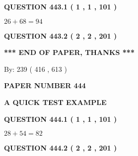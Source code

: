 \documentclass[12pt]{article}
\begin{document}
\vspace{0.2in}
  
{\textbf{\Large{QUESTION
443.1 
 ( 1 , 1 , 101 )
}}}
  
  
 
 

$ %
26 +  %
68=   %
94$
 
 
  
\vspace{0.2in}
  
{\textbf{\Large{QUESTION
443.2 
 ( 2 , 2 , 201 )
}}}
  
  
   
   
 \vspace{0.2in}
 
   
   
   
   
\vspace{1.0in} 
{\textbf{\large{ *** END OF PAPER, THANKS *** }}} 
   
   
\hspace{1.0in} By: 
 239 ( 416 ,  613 )
   
   
   
   
\newpage 
\setcounter{page}{ 
   444001 } 
   
   
   
   
 {\textbf{ \Large{ PAPER NUMBER  444  }}}
   
   
\vspace{0.2in}
   
   
   
   
   
   
 \vspace{0.2in}
{\LARGE {\textbf{ A QUICK TEST EXAMPLE}}}
   
   
  
\vspace{0.2in}
  
{\textbf{\Large{QUESTION
444.1 
 ( 1 , 1 , 101 )
}}}
  
  
 
 

$ %
28 +  %
54=   %
82$
 
 
  
\vspace{0.2in}
  
{\textbf{\Large{QUESTION
444.2 
 ( 2 , 2 , 201 )
}}}
  
  
   
   
 \vspace{0.2in}
 
\end{document}

